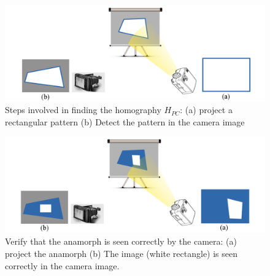 \documentclass[11pt, oneside, reqno]{book}
\begin{document}
\begin{figure}[h]
	\centering
	\includegraphics[width=\linewidth]{data/result_rect/setup/setup1_view}
	\caption{Steps involved in finding the homography $H_{PC}$: (a) project a rectangular pattern (b) Detect the pattern in the camera image}
	\label{fig:basicModelsetup1}
\end{figure}

\begin{figure}[h]
	\centering
	\includegraphics[width=\linewidth]{data/result_rect/setup/setup1_viewAnamorph}
	\caption{Verify that the anamorph is seen correctly by the camera: (a) project the anamorph (b) The image (white rectangle) is seen correctly in the camera image.}
	\label{fig:basicModelsetup2}
\end{figure}

\end{document}
